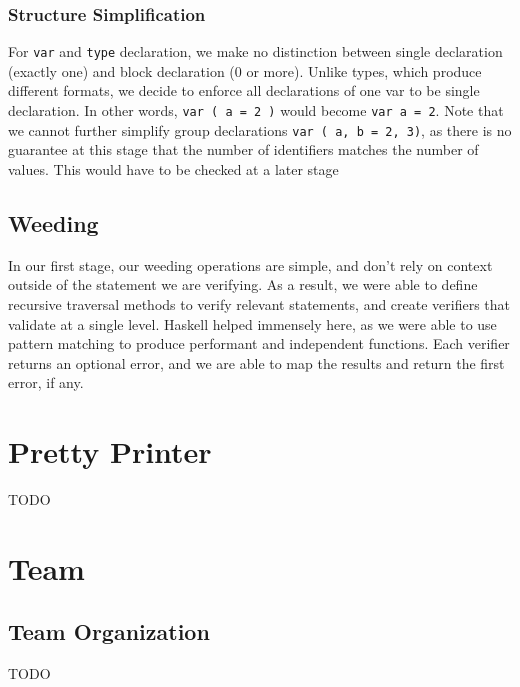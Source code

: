 \documentclass[11pt]{article}
\begin{document}
\subsubsection{Structure Simplification}
\label{sec:org7e5e843}
For \texttt{var} and \texttt{type} declaration, we make no distinction between
single declaration (exactly one) and block declaration (0 or
more). Unlike types, which produce different formats, we decide to
enforce all declarations of one var to be single declaration. In
other words, \texttt{var ( a = 2 )} would become \texttt{var a = 2}. Note that
we cannot further simplify group declarations \texttt{var ( a, b = 2,
    3)}, as there is no guarantee at this stage that the number of
identifiers matches the number of values. This would have to be
checked at a later stage
\subsection{Weeding}
\label{sec:org11727ac}
In our first stage, our weeding operations are simple, and don't rely
on context outside of the statement we are verifying. As a result,
we were able to define recursive traversal methods to verify relevant
statements, and create verifiers that validate at a single level.
Haskell helped immensely here, as we were able to use pattern matching
to produce performant and independent functions.
Each verifier returns an optional error, and we are able to map the results
and return the first error, if any.
\section{Pretty Printer}
\label{sec:org76db7d5}
TODO
\section{Team}
\label{sec:org75fd43f}
\subsection{Team Organization}
\label{sec:orgc5604c4}
TODO
\end{document}
